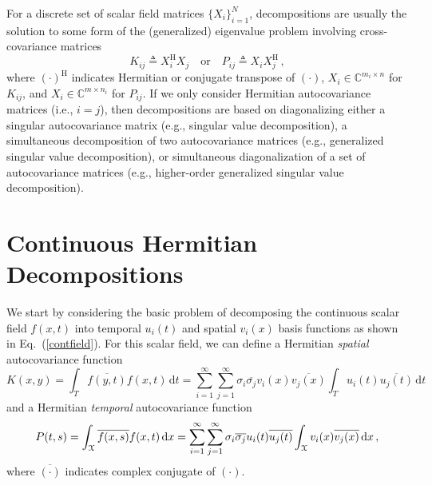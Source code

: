 \documentclass[10pt]{article}
\newcommand{\norm}[1]{\left\Vert#1\right\Vert}
\newcommand{\eq}[1]{Eq.\ (\ref{#1})}
\begin{document}
For a discrete set of scalar field matrices $\{X_i\}_{i=1}^N$, decompositions are usually the solution to some form of the (generalized) eigenvalue problem involving cross-covariance matrices
\begin{equation}
    K_{ij} \triangleq X_i^\mathrm{H} X_j \quad \mathrm{or}\quad 
    P_{ij} \triangleq X_i X_j^\mathrm{H}\,,
\end{equation}
where $(\cdot)^\mathrm{H}$ indicates Hermitian or conjugate transpose of $(\cdot)$, $X_i\in\mathbb{C}^{m_i\times n}$ for $K_{ij}$, and $X_i\in \mathbb{C}^{m\times n_i}$ for $P_{ij}$.
If we only consider Hermitian autocovariance matrices (i.e., $i=j$), then decompositions are based on diagonalizing either a singular autocovariance matrix (e.g., singular value decomposition), a simultaneous decomposition of two autocovariance matrices (e.g., generalized singular value decomposition), or simultaneous diagonalization of a set of autocovariance matrices (e.g., higher-order generalized singular value decomposition).

\section{Continuous Hermitian Decompositions}

We start by considering the basic problem of decomposing the continuous scalar field
$f(x,t)$ into temporal $u_i(t)$ and spatial $v_i(x)$ basis functions as shown in \eq{contfield}.
For this scalar field, we can define a Hermitian {\em spatial} autocovariance function
\begin{equation}\label{Kxx}
    K(x,y) = 
    \int_T \overline{f(y,t)} f(x,t)\, \mathrm{d}t = \sum_{i=1}^{\infty}\sum_{j=1}^{\infty} \sigma_{i} \overline{\sigma_{j}} v_i(x)\overline{v_j(x)} 
    \int_T u_i(t) \overline{u_j(t)}\, \mathrm{d} t
\end{equation}
and a Hermitian {\em temporal} autocovariance function
\begin{equation}
    P(t,s) = %
    \int_{\cal X} \overline{f(x,s)}f(x,t) \, \mathrm{d} x = \sum_{i=1}^{\infty}\sum_{j=1}^{\infty} \sigma_{i} \overline{\sigma_{j}} u_i(t) \overline{u_j(t)}
    \int_{\cal X} v_i(x)\overline{v_j(x)} \, \mathrm{d} x\,,
\end{equation}
where $\overline{(\cdot)}$ indicates complex conjugate of ${(\cdot)}$.
\end{document}
